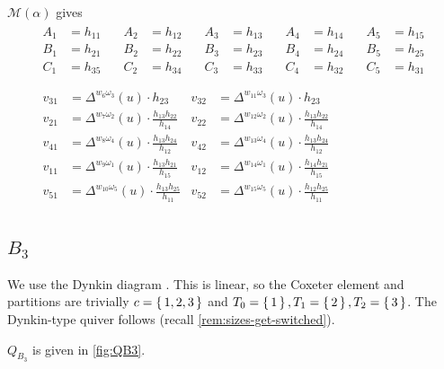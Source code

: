 \documentclass{amsart}
\theoremstyle{plain}
\theoremstyle{definition}
\theoremstyle{remark}
\newcommand{\conftoquiv}{\mathcal{M}}
\newcommand{\fundamentalweight}{\omega}
\newcommand{\genminor}[2]{\Delta^{{#1} \fundamentalweight_{#2}}}
\newcommand{\inldynkinBthree}{\raisebox{-0.1ex}{}}
\begin{document}
  $\conftoquiv(\alpha)$ gives
  \begin{equation*}
    \begin{gathered}
      \begin{aligned}
        A_1 &= h_{11} &\quad A_2 &= h_{12} &\quad A_3 &= h_{13} &\quad A_4 &= h_{14} &\quad A_5 &= h_{15} \\
        B_1 &= h_{21} &\quad B_2 &= h_{22} &\quad B_3 &= h_{23} &\quad B_4 &= h_{24} &\quad B_5 &= h_{25} \\
        C_1 &= h_{35} &\quad C_2 &= h_{34} &\quad C_3 &= h_{33} &\quad C_4 &= h_{32} &\quad C_5 &= h_{31} \\
      \end{aligned}
      \\
      \begin{aligned}
        v_{3 1} &= \genminor{w_{6}}{3}(u) \cdot h_{23} &v_{3 2} &= \genminor{w_{11}}{3}(u) \cdot h_{23} \\
        v_{2 1} &= \genminor{w_{7}}{2}(u) \cdot \frac{h_{13} h_{22} }{h_{14}} &v_{2 2} &= \genminor{w_{12}}{2}(u) \cdot \frac{h_{13} h_{22} }{h_{14}} \\
        v_{4 1} &= \genminor{w_{8}}{4}(u) \cdot \frac{h_{13} h_{24} }{h_{12}} &v_{4 2} &= \genminor{w_{13}}{4}(u) \cdot \frac{h_{13} h_{24} }{h_{12}} \\
        v_{1 1} &= \genminor{w_{9}}{1}(u) \cdot \frac{h_{13} h_{21} }{h_{15}} &v_{1 2} &= \genminor{w_{14}}{1}(u) \cdot \frac{h_{14} h_{21} }{h_{15}} \\
        v_{5 1} &= \genminor{w_{10}}{5}(u) \cdot \frac{h_{13} h_{25} }{h_{11}} &v_{5 2} &= \genminor{w_{15}}{5}(u) \cdot \frac{h_{12} h_{25} }{h_{11}}
      \end{aligned}
    \end{gathered}
  \end{equation*}

  \subsection{\texorpdfstring{$B_3$}{B\_3}}

  We use the Dynkin diagram \inldynkinBthree. This is linear, so the
  Coxeter element and partitions are trivially $c = \set{1, 2, 3}$ and
  $T_0 = \set{1}, T_1 = \set{2}, T_2 = \set{3}$. The Dynkin-type quiver
  follows (recall \cref{rem:sizes-get-switched}).

  {\centering 

  } $Q_{B_3}$ is given in \cref{fig:QB3}.
\end{document}
